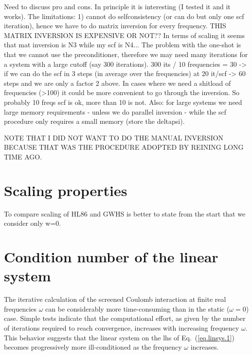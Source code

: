 \documentclass[twocolumn,prb,showpacs,superscriptaddress]{revtex4}
\def\w{\omega}
\begin{document}
Need to discuss pro and cons. In principle it is interesting (I tested it and it works).
The limitations: 1) cannot do selfconsistency (or can do but only one scf iteration),
hence we have to do matrix inversion for every frequency.
THIS MATRIX INVERSION IS EXPENSIVE OR NOT??
In terms of scaling it seems that mat inversion is N3 while my scf is N4...
The problem with the one-shot is that we cannot use the preconditioner,
therefore we may need many iterations for a system with a large cutoff
(say 300 iterations). 300 its / 10 frequencies = 30 -> if we can do the
scf in 3 steps (in average over the frequencies) at 20 it/scf -> 60 steps
and we are only a factor 2 above.
In cases where we need a shitload of frequencies (>100) it could be
more convenient to go through the inversion.
So probably 10 freqs scf is ok, more than 10 is not.
Also: for large systems we need large memory requirements - unless we do parallel inversion -
while the scf procedure only requires a small memory (store the deltapsi).

NOTE THAT I DID NOT WANT TO DO THE MANUAL INVERSION BECAUSE THAT
WAS THE PROCEDURE ADOPTED BY REINING LONG TIME AGO.


\section{Scaling properties}

To compare scaling of HL86 and GWHS is better to state from the start that
we consider only w=0.

\section{Condition number of the linear system}

The iterative calculation of the screened Coulomb interaction at finite real
frequencies $\w$ can be considerably more time-consuming than in the static
($\w=0$) case. Simple tests indicate that the computational effort, as given
by the number of iterations required to reach convergence, increases with 
increasing frequency $\w$. This behavior suggests that the linear system 
on the lhs of Eq.\ (\ref{eq.linsys.1}) becomes progressively more ill-conditioned 
as the frequency $\w$ increases.
\end{document}

